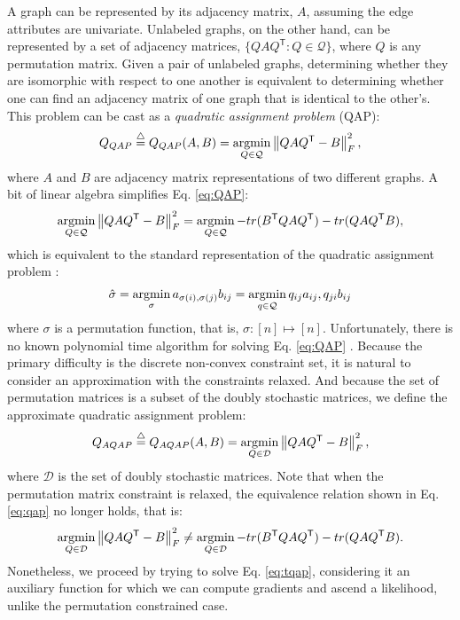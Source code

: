 \documentclass{article} %
\providecommand{\norm}[1]{\left \lVert#1 \right  \rVert}
\newcommand{\argmin}{\operatornamewithlimits{argmin}}
\newcommand{\T}{^{\ensuremath{\mathsf{T}}}}           %
\providecommand{\mc}[1]{\mathcal{#1}}
\providecommand{\mh}[1]{\hat{#1}}
\newcommand{\defeq}{\overset{\triangle}{=}}
\begin{document}
A graph can be represented by its adjacency matrix, $A$, assuming the edge attributes are univariate.  Unlabeled graphs, on the other hand, can be represented by a set of adjacency matrices, $\{QAQ\T : Q \in \mc{Q}\}$, where $Q$ is any permutation matrix.  Given a pair of unlabeled graphs, determining whether they are isomorphic with respect to one another is equivalent to determining whether one can find an adjacency matrix of one graph that is identical to the other's.  This problem can be cast as a \emph{quadratic assignment problem} (QAP):
 \begin{align} \label{eq:QAP}
	Q_{QAP} \defeq Q_{QAP}(A,B)= \argmin_{Q \in \mc{Q}} \norm{Q A Q\T - B}^2_F,
\end{align}
where $A$ and $B$ are adjacency matrix representations of two different graphs. A bit of linear algebra simplifies Eq. \eqref{eq:QAP}: %
\begin{align} \label{eq:qap}
	\argmin_{Q \in \mc{Q}} \norm{Q A Q\T - B}^2_F = \argmin_{Q \in \mc{Q}} - tr(B\T QAQ\T) - tr(QAQ\T B),			
\end{align}
which is equivalent to the standard representation of the quadratic assignment problem \cite{Conte2004}:
\begin{align}
	\mh{\sigma}= \argmin_{\sigma} a_{\sigma(i), \sigma(j)} b_{ij} = \argmin_{q \in \mc{Q}} q_{ij} a_{ij}, q_{ji} b_{ij}
\end{align}
where $\sigma$ is a permutation function, that is, $\sigma: [n] \mapsto [n]$.  Unfortunately, there is no known polynomial time algorithm for solving Eq. \eqref{eq:QAP} \cite{Garey1979a}.  Because the primary difficulty is the discrete non-convex constraint set, it is natural to consider an approximation with the constraints relaxed.  And because the set of permutation matrices is a subset of the doubly stochastic matrices, we define the approximate quadratic assignment problem:
\begin{align} \label{eq:tqap}
	Q_{AQAP} \defeq Q_{AQAP}(A,B) = \argmin_{Q \in \mc{D}} \norm{Q A Q\T - B}^2_F,
\end{align}
where $\mc{D}$ is the set of doubly stochastic matrices.  Note that when the permutation matrix constraint is relaxed, the equivalence relation shown in Eq. \eqref{eq:qap} no longer holds, that is:
\begin{align} \label{eq:nqap}
	\argmin_{Q \in \mc{D}} \norm{Q A Q\T - B}^2_F \neq \argmin_{Q \in \mc{D}} - tr(B\T QAQ\T) - tr(QAQ\T B).
\end{align}
Nonetheless, we proceed by trying to solve Eq. \eqref{eq:tqap}, considering it an auxiliary function for which we can compute gradients and ascend a likelihood, unlike the permutation constrained case.  
\end{document}
